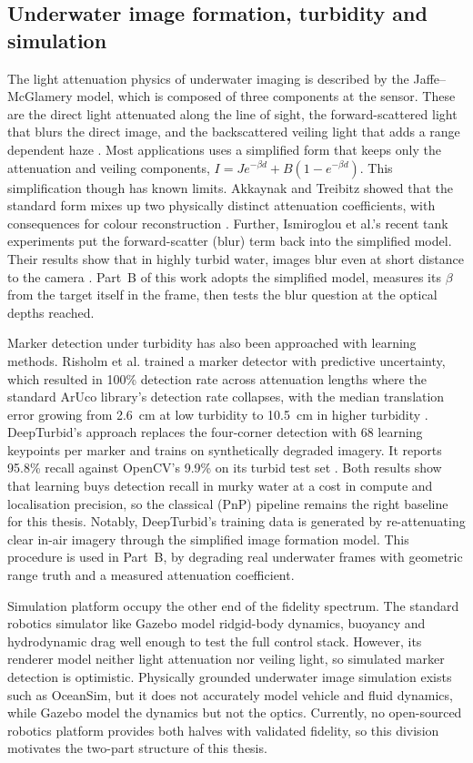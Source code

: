 \subsection{Underwater image formation, turbidity and simulation}
\label{sec:lit-image-formation}

The light attenuation physics of underwater imaging is described by the Jaffe--McGlamery model, which is composed of three components at the sensor. These are the direct light attenuated along the line of sight, the forward-scattered light that blurs the direct image, and the backscattered veiling light that adds a range dependent haze \cite{mcglamery1980computer,jaffe1990computer}. Most applications uses a simplified form that keeps only the attenuation and veiling components, $I = J e^{-\beta d} + B(1 - e^{-\beta d})$. This simplification though has known limits. Akkaynak and Treibitz showed that the standard form mixes up two physically distinct attenuation coefficients, with consequences for colour reconstruction \cite{akkaynak2018revised}. Further, Ismiroglou et al.'s recent tank experiments put the forward-scatter (blur) term back into the simplified model. Their results show that in highly turbid water, images blur even at short distance to the camera \cite{ismiroglou2025seaing}. Part~B of this work adopts the simplified model, measures its $\beta$ from the target itself in the frame, then tests the blur question at the optical depths reached.

Marker detection under turbidity has also been approached with learning methods. Risholm et al. trained a marker detector with predictive uncertainty, which resulted in 100\% detection rate across attenuation lengths where the standard ArUco library's detection rate collapses, with the median translation error growing from 2.6~cm at low turbidity to 10.5~cm in higher turbidity \cite{risholm2021underwater}. DeepTurbid's approach replaces the four-corner detection with 68 learning keypoints per marker and trains on synthetically degraded imagery. It reports 95.8\% recall against OpenCV's 9.9\% on its turbid test set \cite{meng2026deepturbid}. Both results show that learning buys detection recall in murky water at a cost in compute and localisation precision, so the classical (PnP) pipeline remains the right baseline for this thesis. Notably, DeepTurbid's training data is generated by re-attenuating clear in-air imagery through the simplified image formation model. This procedure is used in Part~B, by degrading real underwater frames with geometric range truth and a measured attenuation coefficient.

Simulation platform occupy the other end of the fidelity spectrum. The standard robotics simulator like Gazebo model ridgid-body dynamics, buoyancy and hydrodynamic drag well enough to test the full control stack. However, its renderer model neither light attenuation nor veiling light, so simulated marker detection is optimistic. Physically grounded underwater image simulation exists such as OceanSim, but it does not accurately model vehicle and fluid dynamics, while Gazebo model the dynamics but not the optics. Currently, no open-sourced robotics platform provides both halves with validated fidelity, so this division motivates the two-part structure of this thesis.
